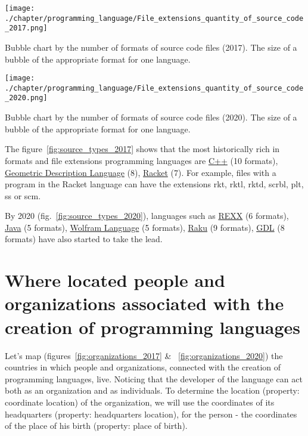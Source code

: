 \begin{marginfigure}[-15cm]
	\texttt{[image: ./chapter/programming\_language/File\_extensions\_quantity\_of\_source\_code\_2017.png]}
	\caption{Bubble chart by the number of formats of source code files (2017). The size of a bubble of the appropriate format for one language.}
	\label{fig:source_types_2017}
\end{marginfigure}
\begin{marginfigure}[-3cm]
	\texttt{[image: ./chapter/programming\_language/File\_extensions\_quantity\_of\_source\_code\_2020.png]}
	\caption{Bubble chart by the number of formats of source code files (2020). The size of a bubble of the appropriate format for one language.}
	\label{fig:source_types_2020}
\end{marginfigure}

The figure~\ref{fig:source_types_2017} shows that the most historically rich in formats and file extensions programming languages are \href{https://en.wikipedia.org/wiki/C\%2B\%2B}{C++} (10 formats), \href{https://en.wikipedia.org/wiki/Geometric_Description_Language}{Geometric Description Language} (8), \href{https://en.wikipedia.org/wiki/Racket}{Racket} (7). For example, files with a program in the Racket language can have the extensions rkt, rktl, rktd, scrbl, plt, ss or scm.

By 2020 (fig.~\ref{fig:source_types_2020}), languages such as  \href{https://en.wikipedia.org/wiki/REXX}{REXX} (6 formats), \href{https://en.wikipedia.org/wiki/Java_(programming_language)}{Java} (5 formats), \href{https://en.wikipedia.org/wiki/Wolfram_Language}{Wolfram Language} (5 formats), \href{https://en.wikipedia.org/wiki/Raku_(programming_language)}{Raku} (9 formats), \href{https://en.wikipedia.org/wiki/Geometric_Description_Language}{GDL} (8 formats) have also started to take the lead.

\section{Where located people and organizations associated with the creation of programming languages}

Let's map (figures~\ref{fig:organizations_2017} \& ~\ref{fig:organizations_2020}) the countries in which people and organizations, connected with the creation of programming languages, live. Noticing that the developer of the language can act both as an organization and as individuals. To determine the location (property: coordinate location) of the organization, we will use the coordinates of its headquarters (property: headquarters location), for the person - the coordinates of the place of his birth (property: place of birth).

